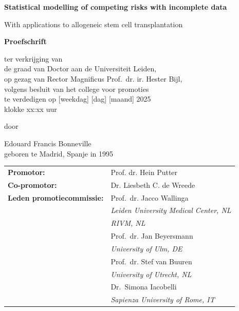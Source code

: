 \documentclass[
  letterpaper,
  paper=240mm:170mm,
  twoside=true,
  open=right,
  fontsize=10pt,
  pagesize=false,
  BCOR=15mm,
  DIV=14,
  headinclude=true,
  footinclude=false,
  headsepline=on]{scrbook}
\newcommand{\bsf}[1]{\textbf{\textsf{#1}}}
\begin{document}
\begin{center}
  \bsf{\huge Statistical modelling of competing risks with incomplete
data} \par %
  \smallskip
  \textsf{\Large With applications to allogeneic stem cell
transplantation} \par
  \vfill
  \textbf{\large Proefschrift} \par
  \vspace{2\baselineskip}
  \large{
    ter verkrijging van \\
    de graad van Doctor aan de Universiteit Leiden, \\
    op gezag van Rector Magnificus Prof.~dr. ir. Hester Bijl, \\
    volgens besluit van het college voor promoties \\
    te verdedigen op {[}weekdag{]} {[}dag{]} {[}maand{]} 2025  \\
    klokke xx:xx uur
  } \par
  \vspace{2\baselineskip}
  \large{door} \par
  \vspace{2\baselineskip}
  \large{Edouard Francis Bonneville} \\
  \normalsize{geboren te Madrid, Spanje in 1995} \par
\end{center}


\clearpage
\thispagestyle{empty}

\noindent\begin{tabular}{p{14em} l}
    \normalsize\bsf{Promotor:} & \normalsize Prof. dr. Hein Putter \\
    \rule{0pt}{4ex}\normalsize\bsf{Co-promotor:} & \normalsize Dr. Liesbeth C. de Wreede \\
    \normalsize
    \rule{0pt}{8ex}\bsf{Leden promotiecommissie:}
     &
      \rule{0pt}{4ex}\normalsize Prof.~dr. Jacco Wallinga
       \\[0.2mm] &
        \indent\textit{Leiden University Medical Center, NL}
       \\[0.2mm] &
        \indent\textit{RIVM, NL}
       \\
     &
      \rule{0pt}{4ex}\normalsize Prof.~dr. Jan Beyersmann
       \\[0.2mm] &
        \indent\textit{University of Ulm, DE}
       \\
     &
      \rule{0pt}{4ex}\normalsize Prof.~dr. Stef van Buuren
       \\[0.2mm] &
        \indent\textit{University of Utrecht, NL}
       \\
     &
      \rule{0pt}{4ex}\normalsize Dr.~Simona Iacobelli
       \\[0.2mm] &
        \indent\textit{Sapienza University of Rome, IT}
       \\
    
\end{tabular}
\end{document}
